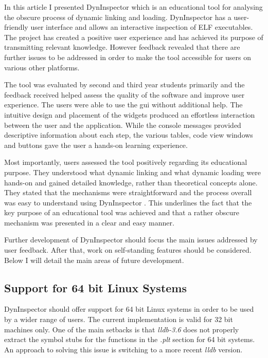 In this article I presented DynInspector which is an educational tool for analysing the obscure process of dynamic linking and loading. DynInspector has a user-friendly user interface and allows an interactive inspection of ELF executables. The project has created a positive user experience and has achieved its purpose of transmitting relevant knowledge. However feedback revealed that there are further issues to be addressed in order to make the tool accessible for users on various other platforms.

The tool was evaluated by second and third year students primarily and the feedback received helped assess the quality of the software and improve user experience. The users were able to use the gui without additional help. The intuitive design and placement of the widgets produced an effortless interaction between the user and the application. While the console messages provided descriptive information about each step, the various tables, code view windows and buttons gave the user a hands-on learning experience.

Most importantly, users assessed the tool positively regarding its educational purpose. They understood what dynamic linking and what dynamic loading were hands-on and gained detailed knowledge, rather than theoretical concepts alone. They stated that the mechanisms were straightforward and the process overall was easy to understand using DynInspector . This underlines the fact that the key purpose of an educational tool was achieved and that a rather obscure mechanism was presented in a clear and easy manner.

Further development of DynInspector should focus the main issues addressed by user feedback. After that, work on self-standing features should be considered. Below I will detail the main areas of future development.

\subsection{Support for 64 bit Linux Systems}

DynInspector should offer support for 64 bit Linux systems in order to be used by a wider range of users. The current implementation is valid for 32 bit machines only. One of the main setbacks is that \textit{lldb-3.6} does not properly extract the symbol stubs for the functions in the \textit{.plt} section for 64 bit systems. An approach to solving this issue is switching to a more recent \textit{lldb} version.

